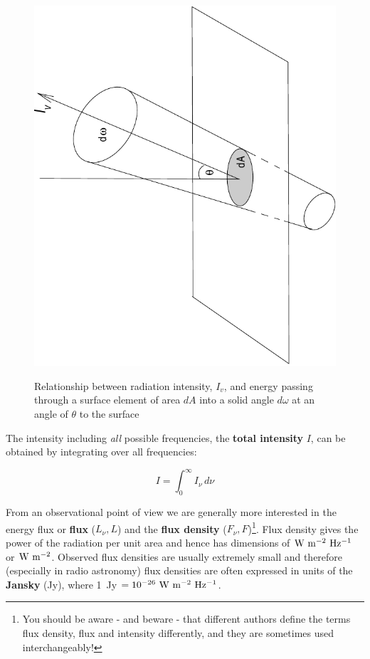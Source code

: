 \documentclass[twoside,11pt,nolof]{starlink}
\begin{document}
\begin{figure}[htbp]
   \centering
   \includegraphics[totalheight=5in,angle=270]{sc6_intensity}
   \begin{quote}
   \caption{Relationship between radiation intensity, $I_v$, and energy
    passing through a surface element of area $dA$ into a solid angle
    $d\omega$ at an angle of $\theta$ to the surface
   \label{INTENSITY} }
   \end{quote}
\end{figure}

The intensity including \textit{all} possible frequencies, the \textbf{total
intensity} $I$, can be obtained by integrating over all frequencies:

\begin{equation}
I= \int_{0}^{\infty}I_\nu\,d\nu
\end{equation}

From an observational point of view we are generally more interested in
the energy flux or \textbf{flux} ($L_\nu, L$) and the \textbf{flux density}
($F_\nu, F$)\footnote{You should be aware - and beware - that different
authors define the terms flux density, flux and intensity differently,
and they are sometimes used interchangeably!}. Flux density gives the
power of the radiation per unit area and hence has dimensions of ${\rm
W~m^{-2}~Hz^{-1}}$ or ${\rm W~m^{-2}}$. Observed flux densities are
usually extremely small and therefore (especially in radio astronomy)
flux densities are often expressed in units of the \textbf{Jansky}
(Jy), where 1~Jy $= 10^{-26}~{\rm W~m^{-2}~Hz^{-1}}$.
\end{document}
